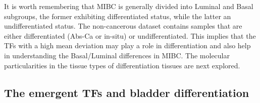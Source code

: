 It is worth remembering that MIBC is generally divided into Luminal and Basal subgroups, the former exhibiting differentiated status, while the latter an undifferentiated status. The non-cancerous dataset contains samples that are either differentiated (Abs-Ca or in-situ) or undifferentiated. This implies that the TFs with a high mean deviation may play a role in differentiation and also help in understanding the Basal/Luminal differences in MIBC. The molecular particularities in the tissue types of differentiation tissues are next explored.


\subsection*{The emergent TFs and bladder differentiation} \label{s:N:sel_tf_diff_status}

